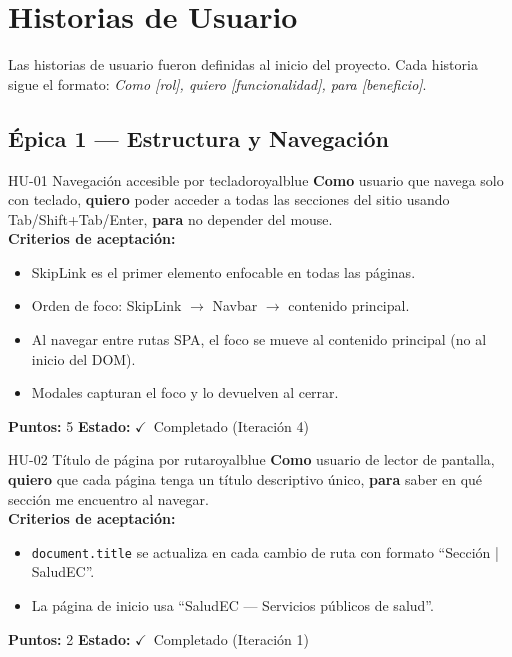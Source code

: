 \documentclass[12pt, a4paper]{article}
\newcommand{\cmark}{\textcolor{successgreen}{$\checkmark$}}
\begin{document}
\section{Historias de Usuario}

Las historias de usuario fueron definidas al inicio del proyecto. Cada historia sigue el formato: \textit{Como [rol], quiero [funcionalidad], para [beneficio]}.

\subsection{Épica 1 --- Estructura y Navegación}

\begin{storybox}{HU-01 \quad Navegación accesible por teclado}{royalblue}
\textbf{Como} usuario que navega solo con teclado,
\textbf{quiero} poder acceder a todas las secciones del sitio usando Tab/Shift+Tab/Enter,
\textbf{para} no depender del mouse.\\[4pt]
\textbf{Criterios de aceptación:}
\begin{itemize}
  \item SkipLink es el primer elemento enfocable en todas las páginas.
  \item Orden de foco: SkipLink $\to$ Navbar $\to$ contenido principal.
  \item Al navegar entre rutas SPA, el foco se mueve al contenido principal (no al inicio del DOM).
  \item Modales capturan el foco y lo devuelven al cerrar.
\end{itemize}
\textbf{Puntos:} 5 \quad \textbf{Estado:} \cmark~Completado (Iteración 4)
\end{storybox}

\begin{storybox}{HU-02 \quad Título de página por ruta}{royalblue}
\textbf{Como} usuario de lector de pantalla,
\textbf{quiero} que cada página tenga un título descriptivo único,
\textbf{para} saber en qué sección me encuentro al navegar.\\[4pt]
\textbf{Criterios de aceptación:}
\begin{itemize}
  \item \texttt{document.title} se actualiza en cada cambio de ruta con formato ``Sección | SaludEC''.
  \item La página de inicio usa ``SaludEC --- Servicios públicos de salud''.
\end{itemize}
\textbf{Puntos:} 2 \quad \textbf{Estado:} \cmark~Completado (Iteración 1)
\end{storybox}
\end{document}

